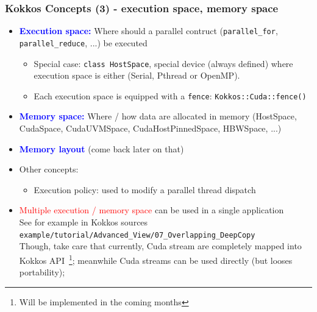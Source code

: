 \begin{frame}
  \frametitle{Kokkos Concepts (3) - execution space, memory space}

  \begin{itemize}
  \item \textcolor{blue}{\textbf{Execution space:}} Where should a parallel contruct (\texttt{parallel\_for}, \texttt{parallel\_reduce}, ...) be executed\\
    \begin{itemize}
    \item Special case: \texttt{class HostSpace}, special device (always defined) where execution space is either (Serial, Pthread or OpenMP).
    \item Each execution space is equipped with a \texttt{fence}: \texttt{Kokkos::Cuda::fence()}
    \end{itemize}
  \item \textcolor{blue}{\textbf{Memory space:}} Where / how data are allocated in memory (HostSpace, CudaSpace, CudaUVMSpace, CudaHostPinnedSpace, HBWSpace, ...)
  \item \textcolor{blue}{\textbf{Memory layout}} (come back later on that)
  \item Other concepts:
    \begin{itemize}
    \item Execution policy: used to modify a parallel thread dispatch
    \end{itemize}
  \item \textcolor{red}{Multiple execution / memory space} can be used in a single application\\
    See for example in Kokkos sources \texttt{example/tutorial/Advanced\_View/07\_Overlapping\_DeepCopy}\\
    Though, take care that currently, Cuda stream are completely mapped into Kokkos API~\footnote{Will be implemented in the coming months}; meanwhile Cuda streams can be used directly (but looses portability); 
  \end{itemize}

\end{frame}

